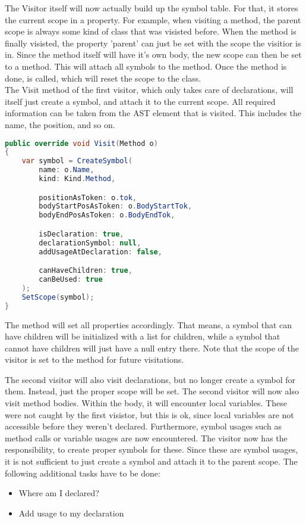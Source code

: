 The Visitor itself will now actually build up the symbol table.
For that, it stores the current scope in a property.
For example, when visiting a method, the parent scope is always some kind of class that was visisted before.
When the method is finally visisted, the property 'parent' can just be set with the scope the visitior is in.
Since the method itself will have it's own body, the new scope can then be set to a method.
This will attach all symbols to the method.
Once the method is done,  is called, which will reset the scope to the class.\\

The Visit method of the first visitor, which only takes care of declarations, will itself just create a symbol, and attach it to the current scope.
All required information can be taken from the AST element that is visited.
This includes the name, the position, and so on.\\

\begin{lstlisting}[language=csharp, caption={Visiting a Method}, captionpos=b, label={lst:visitorvisit1}]
public override void Visit(Method o)
{
    var symbol = CreateSymbol(
        name: o.Name,
        kind: Kind.Method,

        positionAsToken: o.tok,
        bodyStartPosAsToken: o.BodyStartTok,
        bodyEndPosAsToken: o.BodyEndTok,

        isDeclaration: true,
        declarationSymbol: null,
        addUsageAtDeclaration: false,

        canHaveChildren: true,
        canBeUsed: true
    );
    SetScope(symbol);
}
\end{lstlisting}

The  method will set all properties accordingly.
That means, a symbol that can have children will be initialized with a list for children, while a symbol that cannot have children will just have a null entry there.
Note that the scope of the visitor is set to the method for future visitations.

The second visitor will also visit declarations, but no longer create a symbol for them.
Instead, just the proper scope will be set.
The second visitor will now also visit method bodies.
Within the body, it will encounter local variables.
These were not caught by the first visistor, but this is ok, since local variables are not accessible before they weren't declared.
Furthermore, symbol usages such as method calls or variable usages are now encountered.
The visitor now has the responsibility, to create proper symbols for these.
Since these are symbol usages, it is not sufficient to just create a symbol and attach it to the parent scope.
The following additional tasks have to be done:
\begin{itemize}
    \item Where am I declared?
    \item Add usage to my declaration
\end{itemize}

